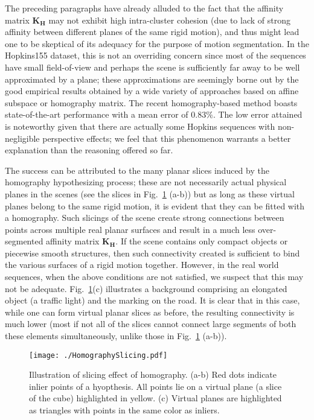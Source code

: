\documentclass[10pt,twocolumn,letterpaper]{article}
\begin{document}
The preceding paragraphs have already alluded to the fact that the affinity matrix $\mathbf{K_H}$ may not exhibit high intra-cluster cohesion (due to lack of strong affinity between different planes of the same rigid motion), and thus might lead one to be skeptical of its adequacy for the purpose of motion segmentation. In the Hopkins155 dataset, this is not an overriding concern since most of the sequences have small field-of-view and perhaps the scene is sufficiently far away to be well approximated by a plane; these approximations are seemingly borne out by the good empirical results obtained by a wide variety of approaches based on affine subspace or homography matrix. The recent homography-based method \cite{Lai2017} boasts state-of-the-art performance with a mean error of $0.83\%$. The low error attained is noteworthy given that there are actually some Hopkins sequences with non-negligible perspective effects; we feel that this phenomenon warrants a better explanation than the reasoning offered so far. 

The success can be attributed to the many planar slices induced by the homography hypothesizing process; these are not necessarily actual physical planes in the scenes (see the slices in Fig.~\ref{fig:planar_slice} (a-b)) but as long as these virtual planes belong to the same rigid motion, it is evident that they can be fitted with a homography. Such slicings of the scene create strong connections between points across multiple real planar surfaces and result in a much less over-segmented affinity matrix $\mathbf{K_H}$. If the scene contains only compact objects or piecewise smooth structures, then such connectivity created is sufficient to bind the various surfaces of a rigid motion together. However, in the real world sequences, when the above conditions are not satisfied, we suspect that this may not be adequate. Fig.~\ref{fig:planar_slice}(c) illustrates a background comprising an elongated object (a traffic light) and the marking on the road. It is clear that in this case, while one can form virtual planar slices as before, the resulting connectivity is much lower (most if not all of the slices cannot connect large segments of both these elements simultaneously, unlike those in Fig.~\ref{fig:planar_slice} (a-b)).



\begin{figure}[!ht]
\begin{center}
\texttt{[image: ./HomographySlicing.pdf]}
\caption{Illustration of slicing effect of homography. (a-b) Red dots indicate inlier points of a hyopthesis. All points lie on a virtual plane (a slice of the cube) highlighted in yellow. (c) Virtual planes are highlighted as triangles with points in the same color as inliers. } \label{fig:planar_slice}
\vspace{-0.9cm}
\end{center}
\end{figure}
\end{document}

